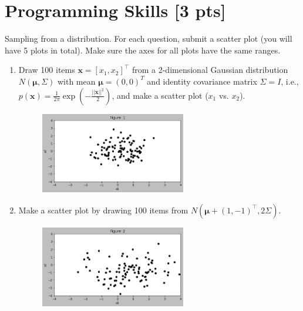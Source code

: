 \documentclass[a4paper]{article}
\theoremstyle{definition}
\newenvironment{soln}{
    \leavevmode\color{blue}\ignorespaces
}{}
\begin{document}
\section{Programming Skills [3 pts]}
Sampling from a distribution.  For each question, submit a scatter plot (you will have 5 plots in total).  Make sure the axes for all plots have the same ranges.
\begin{enumerate}
\item Draw 100 items $\mathbf{x} = [x_1, x_2]^\top$ from a
  2-dimensional Gaussian distribution $N(\mathbf{\mu}, \Sigma)$ with mean $\mathbf{\mu}=(0, 0)^T$ and
  identity covariance matrix $\Sigma=I$, i.e.,
  $p(\mathbf{x}) =
  \frac{1}{2\pi}\exp\left(-\frac{||\mathbf{x}||^2}{2}\right)$, and
  make a scatter plot ($x_1$ vs. $x_2$).  
  
	\begin{soln}
	    
		\begin{figure}[h!]
	        \centering
	        \includegraphics[width=0.6\textwidth]{Assignment_1_Q8_1.png} 
	        \captionsetup{labelformat=empty}
	        \caption{}
	        \label{Fig:1}
	        \end{figure}

	\end{soln}

	\item Make a scatter plot by drawing 100 items from $N(\mathbf{\mu} + (1, -1)^\top, 2 \Sigma)$.
	\begin{soln}
	    
		\begin{figure}[h!]
	        \centering
	        \includegraphics[width=0.6\textwidth]{Assignment_1_Q8_2.png} 
	        \captionsetup{labelformat=empty}
	        \caption{}
	        \label{Fig:2}
	        \end{figure}


\end{soln}
\end{enumerate}
\end{document}
